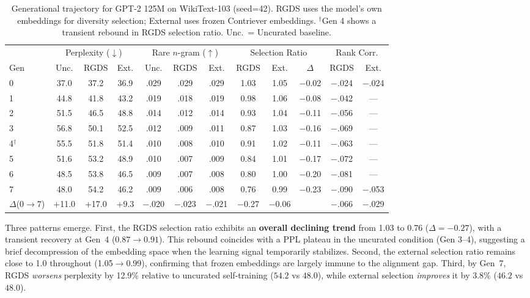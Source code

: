 \documentclass[11pt,a4paper]{article}
\begin{document}
\begin{table}[t]
\centering
\small
\begin{tabular}{l ccc ccc ccc cc}
\toprule
& \multicolumn{3}{c}{Perplexity ($\downarrow$)} & \multicolumn{3}{c}{Rare $n$-gram ($\uparrow$)} & \multicolumn{3}{c}{Selection Ratio} & \multicolumn{2}{c}{Rank Corr.} \\
\cmidrule(lr){2-4} \cmidrule(lr){5-7} \cmidrule(lr){8-10} \cmidrule(lr){11-12}
Gen & Unc. & RGDS & Ext. & Unc. & RGDS & Ext. & RGDS & Ext. & $\Delta$ & RGDS & Ext. \\
\midrule
0 & 37.0 & 37.2 & 36.9 & .029 & .029 & .029 & 1.03 & 1.05 & $-$0.02 & $-$.024 & $-$.024 \\
1 & 44.8 & 41.8 & 43.2 & .019 & .018 & .019 & 0.98 & 1.06 & $-$0.08 & $-$.042 & --- \\
2 & 51.5 & 46.5 & 48.8 & .014 & .012 & .014 & 0.93 & 1.04 & $-$0.11 & $-$.056 & --- \\
3 & 56.8 & 50.1 & 52.5 & .012 & .009 & .011 & 0.87 & 1.03 & $-$0.16 & $-$.069 & --- \\
4$^\dagger$ & 55.5 & 51.8 & 51.4 & .010 & .008 & .010 & 0.91 & 1.02 & $-$0.11 & $-$.063 & --- \\
5 & 51.6 & 53.2 & 48.9 & .010 & .007 & .009 & 0.84 & 1.01 & $-$0.17 & $-$.072 & --- \\
6 & 48.5 & 53.8 & 46.5 & .009 & .007 & .008 & 0.80 & 1.00 & $-$0.20 & $-$.081 & --- \\
7 & 48.0 & 54.2 & 46.2 & .009 & .006 & .008 & 0.76 & 0.99 & $-$0.23 & $-$.090 & $-$.053 \\
\midrule
$\Delta$(0$\to$7) & +11.0 & +17.0 & +9.3 & $-$.020 & $-$.023 & $-$.021 & $-$0.27 & $-$0.06 & & $-$.066 & $-$.029 \\
\bottomrule
\end{tabular}
\caption{Generational trajectory for GPT-2 125M on WikiText-103 (seed=42). RGDS uses the model's own embeddings for diversity selection; External uses frozen Contriever embeddings. $^\dagger$Gen 4 shows a transient rebound in RGDS selection ratio. Unc.\ = Uncurated baseline.}
\label{tab:main}
\end{table}

Three patterns emerge.
First, the RGDS selection ratio exhibits an \textbf{overall declining trend} from 1.03 to 0.76 ($\Delta{=}{-}0.27$), with a transient recovery at Gen~4 ($0.87 \to 0.91$).
This rebound coincides with a PPL plateau in the uncurated condition (Gen 3--4), suggesting a brief decompression of the embedding space when the learning signal temporarily stabilizes.
Second, the external selection ratio remains close to 1.0 throughout (1.05$\to$0.99), confirming that frozen embeddings are largely immune to the alignment gap.
Third, by Gen~7, RGDS \emph{worsens} perplexity by 12.9\% relative to uncurated self-training ($54.2$ vs $48.0$), while external selection \emph{improves} it by 3.8\% ($46.2$ vs $48.0$).
\end{document}
